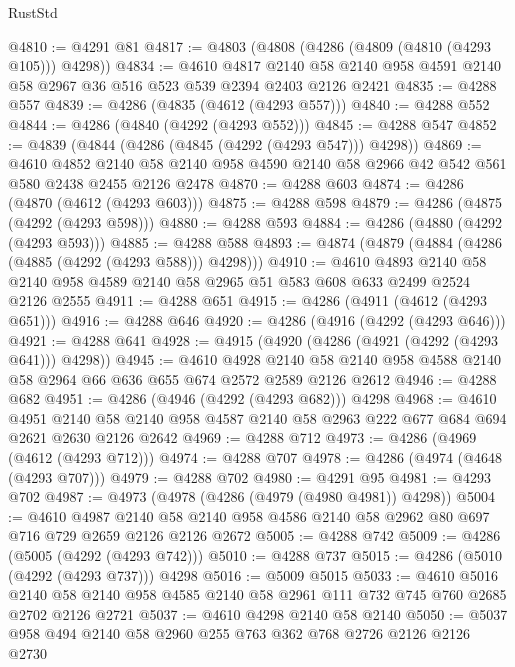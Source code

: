 \begin{lexlean}{RustStd}
\begin{coremodule}
{\begin{coremodule}
{{{{{{{{{{{{{{{{@4810 := @4291 @81
@4817 := @4803 (@4808 (@4286 (@4809 (@4810 (@4293 @105))) @4298))
@4834 := @4610
    @4817
    @2140
    @58
    @2140
    @958
    @4591
    @2140
    @58
    @2967
    @36
    @516
    @523
    @539
    @2394
    @2403
    @2126
    @2421
@4835 := @4288 @557
@4839 := @4286 (@4835 (@4612 (@4293 @557)))
@4840 := @4288 @552
@4844 := @4286 (@4840 (@4292 (@4293 @552)))
@4845 := @4288 @547
@4852 := @4839 (@4844 (@4286 (@4845 (@4292 (@4293 @547))) @4298))
@4869 := @4610
    @4852
    @2140
    @58
    @2140
    @958
    @4590
    @2140
    @58
    @2966
    @42
    @542
    @561
    @580
    @2438
    @2455
    @2126
    @2478
@4870 := @4288 @603
@4874 := @4286 (@4870 (@4612 (@4293 @603)))
@4875 := @4288 @598
@4879 := @4286 (@4875 (@4292 (@4293 @598)))
@4880 := @4288 @593
@4884 := @4286 (@4880 (@4292 (@4293 @593)))
@4885 := @4288 @588
@4893 := @4874 (@4879 (@4884 (@4286 (@4885 (@4292 (@4293 @588))) @4298)))
@4910 := @4610
    @4893
    @2140
    @58
    @2140
    @958
    @4589
    @2140
    @58
    @2965
    @51
    @583
    @608
    @633
    @2499
    @2524
    @2126
    @2555
@4911 := @4288 @651
@4915 := @4286 (@4911 (@4612 (@4293 @651)))
@4916 := @4288 @646
@4920 := @4286 (@4916 (@4292 (@4293 @646)))
@4921 := @4288 @641
@4928 := @4915 (@4920 (@4286 (@4921 (@4292 (@4293 @641))) @4298))
@4945 := @4610
    @4928
    @2140
    @58
    @2140
    @958
    @4588
    @2140
    @58
    @2964
    @66
    @636
    @655
    @674
    @2572
    @2589
    @2126
    @2612
@4946 := @4288 @682
@4951 := @4286 (@4946 (@4292 (@4293 @682))) @4298
@4968 := @4610
    @4951
    @2140
    @58
    @2140
    @958
    @4587
    @2140
    @58
    @2963
    @222
    @677
    @684
    @694
    @2621
    @2630
    @2126
    @2642
@4969 := @4288 @712
@4973 := @4286 (@4969 (@4612 (@4293 @712)))
@4974 := @4288 @707
@4978 := @4286 (@4974 (@4648 (@4293 @707)))
@4979 := @4288 @702
@4980 := @4291 @95
@4981 := @4293 @702
@4987 := @4973 (@4978 (@4286 (@4979 (@4980 @4981)) @4298))
@5004 := @4610
    @4987
    @2140
    @58
    @2140
    @958
    @4586
    @2140
    @58
    @2962
    @80
    @697
    @716
    @729
    @2659
    @2126
    @2126
    @2672
@5005 := @4288 @742
@5009 := @4286 (@5005 (@4292 (@4293 @742)))
@5010 := @4288 @737
@5015 := @4286 (@5010 (@4292 (@4293 @737))) @4298
@5016 := @5009 @5015
@5033 := @4610
    @5016
    @2140
    @58
    @2140
    @958
    @4585
    @2140
    @58
    @2961
    @111
    @732
    @745
    @760
    @2685
    @2702
    @2126
    @2721
@5037 := @4610 @4298 @2140 @58 @2140
@5050 := @5037 @958 @494 @2140 @58 @2960 @255 @763 @362 @768 @2726 @2126 @2126 @2730
}}}}}}}}}}}}}}}}
\end{coremodule}}
\end{coremodule}
\end{lexlean}
